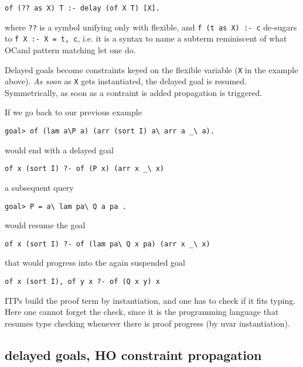 \documentclass{easychair}
\begin{document}
\begin{verbatim}
of (?? as X) T :- delay (of X T) [X].
\end{verbatim}

where \verb+??+ is a symbol unifying only with flexible, and
\verb+f (t as X) :- c+ de-sugars to \verb+f X :- X = t, c+,
i.e. it is a syntax to name a subterm reminiscent of what OCaml
pattern matching let one do.

Delayed goals become constraints keyed on the flexible variable
(\verb+X+ in the example above).  \emph{As soon} as \verb+X+ gets
instantiated, the delayed goal is resumed.  Symmetrically, as soon
as a contraint is added propagation is triggered.

If we go back to our previous example

\begin{verbatim}
goal> of (lam a\P a) (arr (sort I) a\ arr a _\ a).
\end{verbatim}

would end with a delayed goal

\begin{verbatim}
of x (sort I) ?- of (P x) (arr x _\ x)
\end{verbatim}

a subsequent query

\begin{verbatim}
goal> P = a\ lam pa\ Q a pa .
\end{verbatim}

would resume the goal

\begin{verbatim}
of x (sort I) ?- of (lam pa\ Q x pa) (arr x _\ x)
\end{verbatim}

that would progress into the again suspended goal

\begin{verbatim}
of x (sort I), of y x ?- of (Q x y) x
\end{verbatim}

ITPs build the proof term by instantiation, and one has to check
if it fits typing.  Here one cannot forget the check, since it is
the programming language that resumes type checking whenever there is
proof progress (by uvar instantiation).

\subsection{delayed goals, HO constraint propagation}
\end{document}
